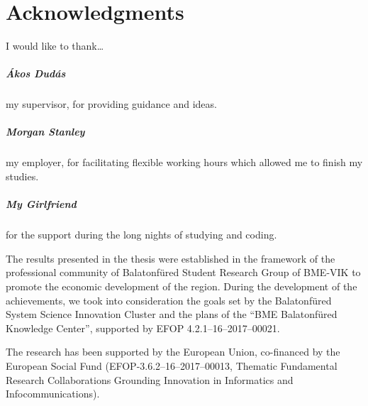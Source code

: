\chapter*{Acknowledgments}
I would like to thank\ldots
\paragraph{Ákos Dudás} my supervisor, for providing guidance and ideas.
\paragraph{Morgan Stanley} my employer, for facilitating flexible working hours which allowed me to finish my studies.
\paragraph{My Girlfriend} for the support during the long nights of studying and coding.

\vspace{2cm}

\small{
The results presented in the thesis were established in the framework of the professional community of Balatonfüred Student Research Group of BME-VIK to promote the economic  development of the region.
During the development of the achievements, we took into consideration the goals set by the Balatonfüred System Science Innovation Cluster and the plans of the ``BME Balatonfüred Knowledge Center'', supported by EFOP 4.2.1--16--2017--00021.

The research has been supported by the European Union, co-financed by the European Social Fund (EFOP-3.6.2--16--2017--00013, Thematic Fundamental Research Collaborations Grounding Innovation in Informatics and Infocommunications).
}